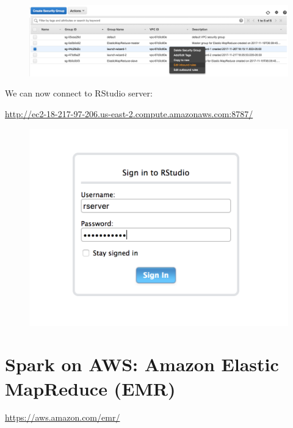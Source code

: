 \documentclass[]{book}
\theoremstyle{definition}
\theoremstyle{definition}
\theoremstyle{definition}
\theoremstyle{remark}
\begin{document}
\begin{figure}

{\centering \includegraphics[width=33.86in]{images/ch6_aws_inbound_rules} 

}

\end{figure}

We can now connect to RStudio server:

\url{http://ec2-18-217-97-206.us-east-2.compute.amazonaws.com:8787/}

\begin{figure}

{\centering \includegraphics[width=12.94in]{images/ch6_aws_rstudio_signin} 

}

\end{figure}

\section{Spark on AWS: Amazon Elastic MapReduce
(EMR)}\label{spark-on-aws-amazon-elastic-mapreduce-emr}

\url{https://aws.amazon.com/emr/}
\end{document}
